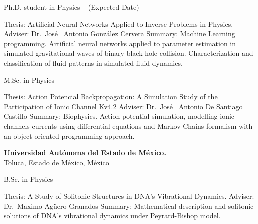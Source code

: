 \documentclass[letterpaper,MMMyyyy,nonstopmode]{simpleresumecv}
\begin{document}
\begin{Body}
\Gap
\BulletItem
Ph.D. student in
{Physics} 
\hfill 
{} -- (Expected Date)

\Gap
\Item
Thesis:
{Artificial Neural Networks Applied to Inverse Problems in Physics.}
\Item
Adviser:
Dr.~Jos\'e~ Antonio Gonz\'alez Cervera
\Item
Summary:
Machine Learning programming. Artificial neural networks applied to parameter estimation in simulated gravitational waves of binary black hole collision. Characterization and classification of fluid patterns in simulated fluid dynamics.

\Gap
\BulletItem
M.Sc. in
{Physics}
\hfill
{} --

\Gap
\Item
Thesis: Action Potencial Backpropagation: A Simulation Study of the Participation of Ionic Channel Kv4.2
\Item
Adviser:
Dr.~Jos\'e~ Antonio De Santiago Castillo
\Item
Summary: Biophysics. Action potential simulation, modelling ionic channels currents using differential equations and Markov Chains formalism with an object-oriented programming approach.

\BigGap
\Entry
\href{http://www.uaemex.mx}
{\textbf{Universidad Aut\'onoma del Estado de M\'exico.}}\\
Toluca, Estado de M\'exico, M\'exico

\Gap
\BulletItem
B.Sc. in
{Physics}
\hfill
{} --

\Gap
\Item
Thesis: A Study of Solitonic Structures in DNA's Vibrational Dynamics.
\Item
Adviser:
Dr.~Maximo Ag\"uero Granados
\Item
Summary: Mathematical description and solitonic solutions of DNA's vibrational dynamics under Peyrard-Bishop model.





\end{Body}
\end{document}
